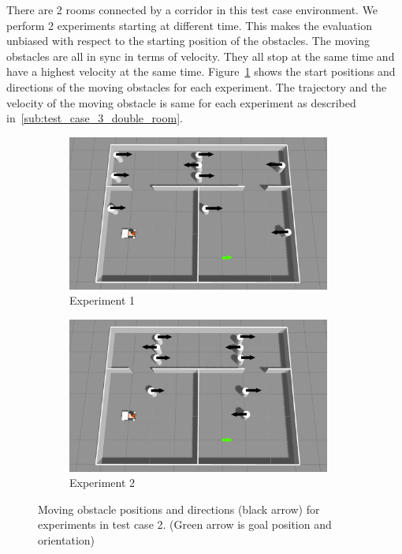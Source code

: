 There are 2 rooms connected by a corridor in this test case environment. We perform 2 experiments 
starting at different time. This makes the evaluation unbiased with respect to
the starting position of the obstacles. The moving obstacles are all in sync in terms of velocity. 
They all stop at the same time and have a highest velocity at the same time.   
Figure~\ref{fig:test_case_3_experiment_start} shows the start positions and directions of the moving
obstacles for each experiment. The trajectory and the velocity of the moving obstacle is same for each
experiment as described in~\ref{sub:test_case_3_double_room}.

\begin{figure}[H]
    \centering
    \begin{subfigure}[b]{0.50\linewidth}
        \centering
        \includegraphics[width=0.95\textwidth]{images/test_case_3/exp1.png}
        \caption{Experiment 1}
    \end{subfigure}%
    \begin{subfigure}[b]{0.50\linewidth}
        \centering
        \includegraphics[width=0.95\textwidth]{images/test_case_3/exp2.png}
        \caption{Experiment 2}
    \end{subfigure}
    \caption{Moving obstacle positions and directions (black arrow) for experiments in test case 2.
    (Green arrow is goal position and orientation)}\label{fig:test_case_3_experiment_start}
\end{figure}


